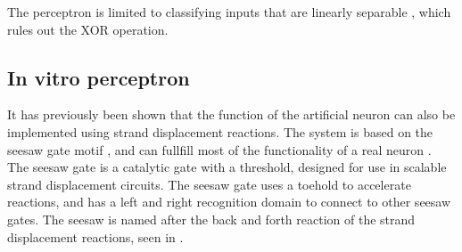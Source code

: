 The perceptron is limited to classifying inputs that are linearly separable \cite{ZhaoYanling}, which rules out the XOR operation.




%
%

\subsection{In vitro perceptron}
It has previously been shown that the function of the artificial neuron can also be implemented using strand displacement reactions. The system is based on the seesaw gate motif \cite{Qian}, and can fullfill most of the functionality of a real neuron \cite{Qian2011}. The seesaw gate is a catalytic gate with a threshold, designed for use in scalable strand displacement circuits. The seesaw gate uses a toehold to accelerate reactions, and has a left and right recognition domain to connect to other seesaw gates. The seesaw is named after the back and forth reaction of the strand displacement reactions, seen in .

